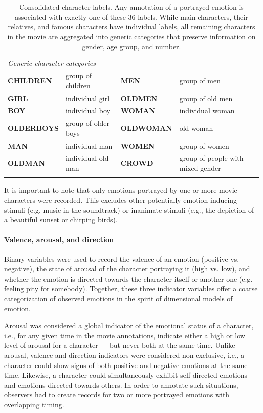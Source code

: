 \documentclass[10pt,a4paper,twocolumn]{article}
\begin{document}
\begin{table}
\begin{tabular}{p{4cm}p{4cm}p{3.6cm}p{4cm}}
\multicolumn{4}{l}{\textit{Generic character categories}} \\
\textbf{CHILDREN}  & group of children & \textbf{MEN}      & group of men \\
\textbf{GIRL}      & individual girl & \textbf{OLDMEN}   & group of old men \\
\textbf{BOY}       & individual boy & \textbf{WOMAN}    & individual woman \\
\textbf{OLDERBOYS} & group of older boys & \textbf{OLDWOMAN} & old woman\\
\textbf{MAN}       & individual man & \textbf{WOMEN}    & group of women \\
\textbf{OLDMAN}    & individual old man & \textbf{CROWD}    & group of people with mixed gender \\
 \\\hline
  \end{tabular}
  \caption{Consolidated character labels. Any annotation of a portrayed emotion
  is associated with exactly one of these 36 labels. While main characters,
  their relatives, and famous characters have individual labels, all remaining
  characters in the movie are aggregated into generic categories that preserve
  information on gender, age group, and number.}
  \label{tab:characters}
\end{table}

It is important to note that only emotions portrayed by one or more movie
characters were recorded. This excludes other potentially emotion-inducing
stimuli (e.g, music in the soundtrack) or inanimate stimuli (e.g., the
depiction of a beautiful sunset or chirping birds).

\paragraph{Valence, arousal, and direction}

Binary variables were used to record the valence of an emotion (positive vs.
negative), the state of arousal of the character portraying it (high vs. low),
and whether the emotion is directed towards the character itself or another one
(e.g. feeling pity for somebody). Together, these three indicator variables
offer a coarse categorization of observed emotions in the spirit of dimensional
models of emotion.

Arousal was considered a global indicator of the emotional status of a
character, i.e., for any given time in the movie annotations, indicate either a
high or low level of arousal for a character --- but never both at the same time.
Unlike arousal, valence and direction indicators were considered non-exclusive,
i.e., a character could show signs of both positive and negative emotions at the
same time. Likewise, a character could simultaneously exhibit self-directed
emotions and emotions directed towards others. In order to annotate such
situations, observers had to create records for two or more portrayed emotions
with overlapping timing.
\end{document}
